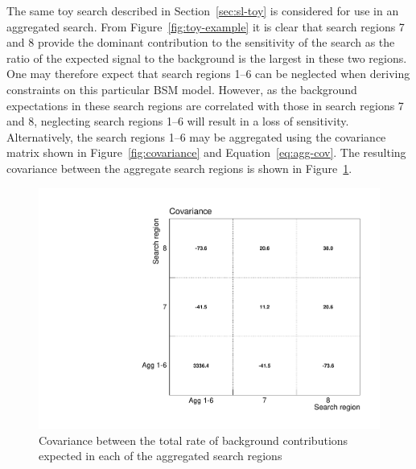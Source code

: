 The same toy search described in Section~\ref{sec:sl-toy} is considered for use in an aggregated search. 
From Figure~\ref{fig:toy-example} it is clear that search regions 7 and 8  provide the dominant contribution to 
the sensitivity of the search as the ratio of the expected signal to the background is the largest in these two regions. 
One may therefore expect that search regions 1--6 can be neglected when deriving constraints on this particular BSM model. 
However, as the background expectations in these search regions are correlated with those in search regions 7 and 8, neglecting search regions 1--6 
will result in a loss of sensitivity.  
Alternatively, the search regions 1--6 may be aggregated using the covariance matrix shown in 
Figure~\ref{fig:covariance} and Equation~\ref{eq:agg-cov}. The resulting covariance
between the aggregate search regions is shown in Figure~\ref{fig:agg-covariance}.

\begin{figure}[hbt]
  \begin{center} 
   \includegraphics[width=1.5\cmsFigWidth]{figures/agg_htsearch_covariance.pdf}
   \caption{Covariance between the total rate of background contributions expected in each of the aggregated search regions}
   \label{fig:agg-covariance} 
  \end{center}
\end{figure}

